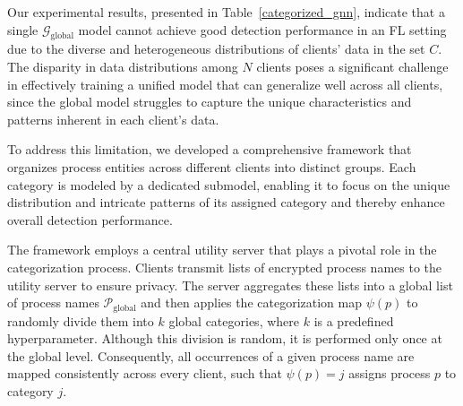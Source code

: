 
Our experimental results, presented in Table~\ref{categorized_gnn}, indicate that a single \( \mathcal{G}_{\text{global}} \) model cannot achieve good detection performance in an FL setting due to the diverse and heterogeneous distributions of clients' data in the set \( C \). The disparity in data distributions among \( N \) clients poses a significant challenge in effectively training a unified model that can generalize well across all clients, since the global model struggles to capture the unique characteristics and patterns inherent in each client's data.

To address this limitation, we developed a comprehensive framework that organizes process entities across different clients into distinct groups. Each category is modeled by a dedicated submodel, enabling it to focus on the unique distribution and intricate patterns of its assigned category and thereby enhance overall detection performance.

The framework employs a central utility server that plays a pivotal role in the categorization process. Clients transmit lists of encrypted process names to the utility server to ensure privacy. The server aggregates these lists into a global list of process names \( \mathcal{P}_{\text{global}} \) and then applies the categorization map \( \psi(p) \) to randomly divide them into \( k \) global categories, where \( k \) is a predefined hyperparameter. Although this division is random, it is performed only once at the global level. Consequently, all occurrences of a given process name are mapped consistently across every client, such that \( \psi(p) = j \) assigns process \( p \) to category \( j \).

